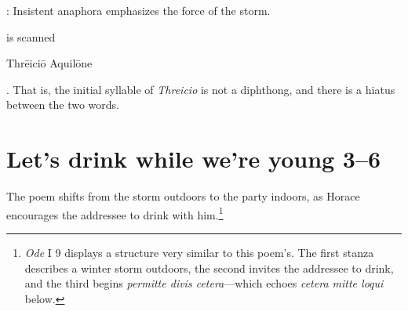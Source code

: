 
: Insistent anaphora emphasizes the force of the storm.


 is scanned \begin{metrica}Thr\=e\-ic\-i\=o
\-Aqu\-il\=on\-e\end{metrica}.  That is, the initial syllable of
\textit{Threicio} is not a diphthong, and there is a hiatus between the two
words.

\section*{Let's drink while we're young 3--6}

The poem shifts from the storm outdoors to the party indoors, as Horace
encourages the addressee to drink with him.\footnote{\textit{Ode} I 9 displays
a structure very similar to this poem's.  The first stanza describes a winter
storm outdoors, the second invites the addressee to drink, and the third begins
\textit{permitte divis cetera}---which echoes \textit{cetera mitte loqui}
below.}


